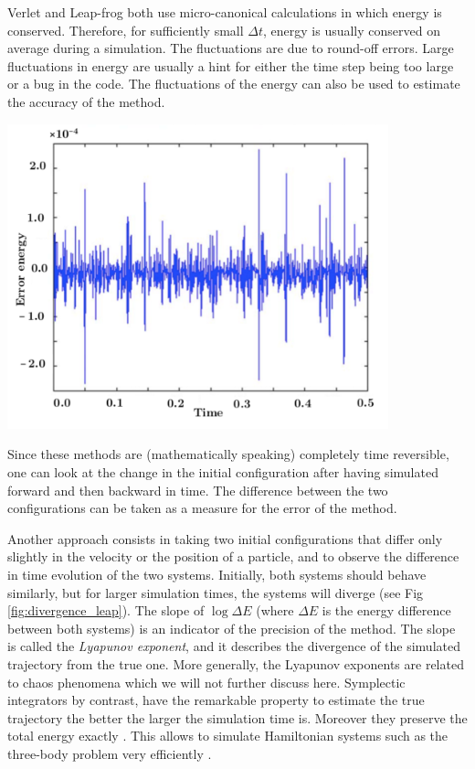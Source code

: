 Verlet and Leap-frog both use micro-canonical calculations in which energy is conserved. Therefore, for sufficiently small $\Delta t$, energy is usually conserved on average during a simulation. The fluctuations are due to round-off errors. Large fluctuations in energy are usually a hint for either the time step being too large or a bug in the code. The fluctuations of the energy can also be used to estimate the accuracy of the method. 

\vspace{0.1cm}
\noindent
\begin{minipage}{\textwidth}
\begin{minipage}{.98\textwidth}
  \centering
  \includegraphics[height=250pt]{pics/energy_leap}
  \label{fig:energy_leap}
\end{minipage}
\end{minipage}
\vspace{0.1cm}

Since these methods are (mathematically speaking) completely time reversible, one can look at the change in the initial configuration after having simulated forward and then backward in time. The difference between the two configurations can be taken as a measure for the error of the method. 

Another approach consists in taking two initial configurations that  differ only slightly in the velocity or the position of a particle, and to observe the difference in time evolution of the two systems. Initially, both systems should behave similarly, but for larger simulation times, the systems will diverge (see Fig \ref{fig:divergence_leap}). The slope of $\log{\Delta E}$ (where $\Delta E$ is the energy difference between both systems) is an indicator of the precision of the method. The slope is called the \emph{Lyapunov exponent}, and it describes the divergence of the simulated trajectory from the true one. More generally, the Lyapunov exponents are related to chaos phenomena which we will not further discuss here. Symplectic integrators by contrast, have the remarkable property to estimate the true trajectory the better the larger the simulation time is. Moreover they preserve the total energy exactly \citep{yoshida}. This allows to simulate Hamiltonian systems such as the three-body problem very efficiently \citep{nagler}.

